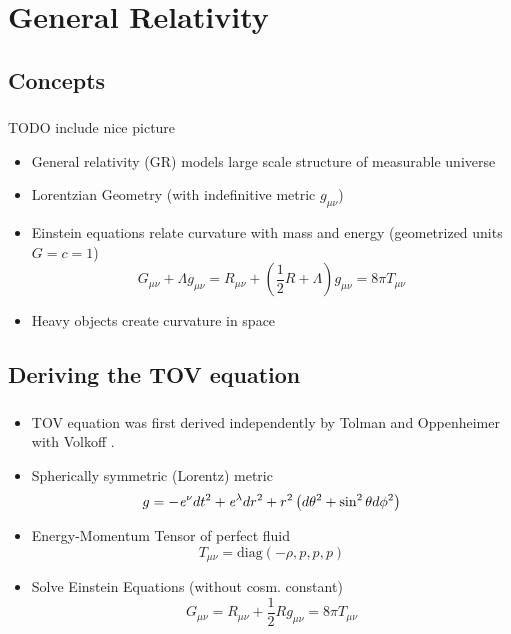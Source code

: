 \section{General Relativity}

\subsection{Concepts}
\begin{frame}
	\frametitle{\insertsubsection}
	TODO include nice picture %
	\begin{itemize}[<+->]
		\item General relativity (GR) models large scale structure of measurable universe
		\item Lorentzian Geometry (with indefinitive metric $g_{\mu\nu}$)
		\item Einstein equations relate curvature with mass and energy (geometrized units $G=c=1$)
		\[G_{\mu\nu} + \Lambda g_{\mu\nu}=R_{\mu\nu}+\left(\frac{1}{2}R+\Lambda\right)g_{\mu\nu}=8\pi T_{\mu\nu}\]
		\item Heavy objects create curvature in space
	\end{itemize}
\end{frame}


\subsection{Deriving the TOV equation}
\begin{frame}
	\frametitle{\insertsubsection}
	\begin{itemize}[<+->]
		\item TOV equation was first derived 
		independently by Tolman \cite{tolmanStaticSolutionsEinstein1939} and 
		Oppenheimer with Volkoff \cite{oppenheimerMassiveNeutronCores1939}.
		\item Spherically symmetric (Lorentz) metric 
		\begin{equation}
			g=-\mathit{e}^\nu dt^2+\mathit{e}^\lambda dr^2+r^2\left(d\theta^2+\sin^2\theta d\phi^2\right)
		\end{equation}
		\item Energy-Momentum Tensor of perfect fluid
		\begin{equation}
			T_{\mu\nu}=\text{diag}(-\rho,p,p,p)
		\end{equation}
		\item Solve Einstein Equations (without cosm. constant)
		\begin{equation}
			G_{\mu\nu}=R_{\mu\nu}+\frac{1}{2}Rg_{\mu\nu}=8\pi T_{\mu\nu}
		\end{equation}
	\end{itemize}
\end{frame}

